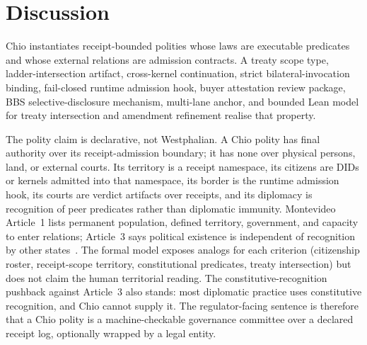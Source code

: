 \section{Discussion}
\label{sec:discussion}

Chio instantiates receipt-bounded polities whose laws are executable predicates and whose external relations are admission contracts. A treaty scope type, ladder-intersection artifact, cross-kernel continuation, strict bilateral-invocation binding, fail-closed runtime admission hook, buyer attestation review package, BBS selective-disclosure mechanism, multi-lane anchor, and bounded Lean model for treaty intersection and amendment refinement realise that property.

The polity claim is declarative, not Westphalian. A Chio polity has final authority over its receipt-admission boundary; it has none over physical persons, land, or external courts. Its territory is a receipt namespace, its citizens are DIDs or kernels admitted into that namespace, its border is the runtime admission hook, its courts are verdict artifacts over receipts, and its diplomacy is recognition of peer predicates rather than diplomatic immunity. Montevideo Article~1 lists permanent population, defined territory, government, and capacity to enter relations; Article~3 says political existence is independent of recognition by other states~\cite{montevideo,crawfordStatehood}. The formal model exposes analogs for each criterion (citizenship roster, receipt-scope territory, constitutional predicates, treaty intersection) but does not claim the human territorial reading. The constitutive-recognition pushback against Article~3 also stands: most diplomatic practice uses constitutive recognition, and Chio cannot supply it. The regulator-facing sentence is therefore that a Chio polity is a machine-checkable governance committee over a declared receipt log, optionally wrapped by a legal entity.

